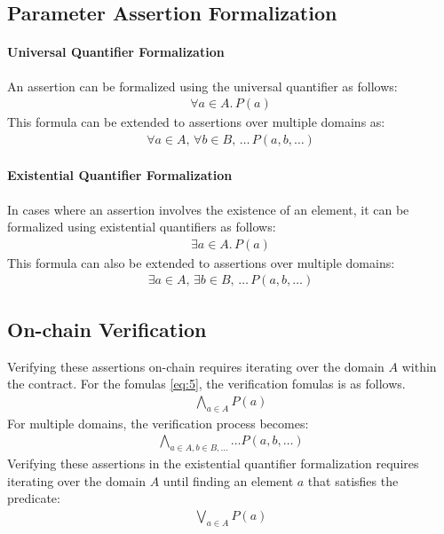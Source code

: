 \documentclass[runningheads]{llncs}
\begin{document}
\subsection{Parameter Assertion Formalization}
\paragraph{Universal Quantifier Formalization}
An assertion can be formalized using the universal quantifier as follows:
\begin{gather}
  \label{eq:1}
  \forall a \in A. \, P(a)
\end{gather}
This formula can be extended to assertions over multiple domains as:
\begin{gather}
  \label{eq:2}
  \forall a \in A, \, \forall b \in B, \, \dots \, P(a, b, \dots)
\end{gather}
\paragraph{Existential Quantifier Formalization}
In cases where an assertion involves the existence of an element, it can be formalized using existential quantifiers as follows:
\begin{gather}
  \label{eq:3}
  \exists a \in A. \, P(a)
\end{gather}
This formula can also be extended to assertions over multiple domains:
\begin{gather}
  \label{eq:4}
  \exists a \in A, \, \exists b \in B, \, \dots \, P(a, b, \dots)
\end{gather}
\subsection{On-chain Verification}
Verifying these assertions on-chain requires iterating over the domain \(A\) within the contract. For the fomulas \ref{eq:5}, the verification fomulas is as follows.
\begin{gather}
  \label{eq:5}
  \bigwedge_{a \in A} P(a)
\end{gather}
For multiple domains, the verification process becomes:
\begin{gather}
  \label{eq:6}
  \bigwedge_{a \in A, b \in B, \dots} \dots P(a, b, \dots)
\end{gather}
Verifying these assertions in  the existential quantifier formalization requires iterating over the domain \(A\) until finding an element \(a\) that satisfies the predicate:
\begin{gather}
  \label{eq:7}
  \bigvee_{a \in A} P(a)
\end{gather}
\end{document}
